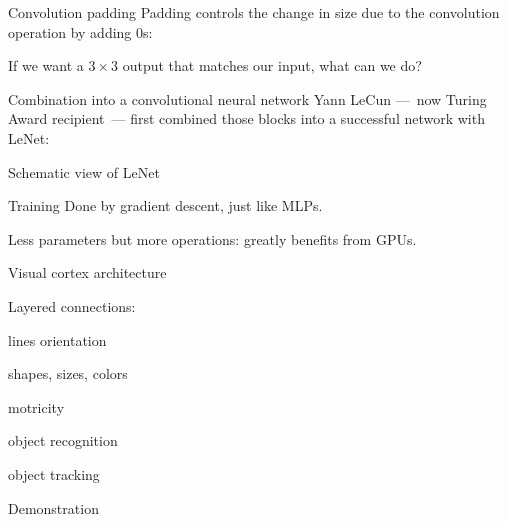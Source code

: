 \begin{frame}{Convolution padding}
  Padding controls the change in size due to the convolution operation by adding $0$s:


  If we want a $3 \times 3$ output that matches our input, what can we do?
\end{frame}

\begin{frame}{Combination into a convolutional neural network}
  Yann LeCun ---~now Turing Award recipient~--- first combined those blocks into a successful network with LeNet:

\end{frame}

\begin{frame}{Schematic view of LeNet}
\end{frame}

\begin{frame}{Training}
  Done by gradient descent, just like MLPs.

  Less parameters but more operations: greatly benefits from GPUs.

\end{frame}

\begin{frame}{Visual cortex architecture}
  \begin{minipage}[l]{0.50\linewidth}
  \end{minipage}\hfill
  \begin{minipage}[l]{0.49\linewidth}
    Layered connections:
    \begin{description}[<+(1)->]
    \item[V1] lines orientation
    \item[V2] shapes, sizes, colors
    \item[V3] motricity
    \item[V4] object recognition
    \item[V5] object tracking
    \end{description}
  \end{minipage}\hfill
\end{frame}

\begin{frame}{Demonstration}
\end{frame}
